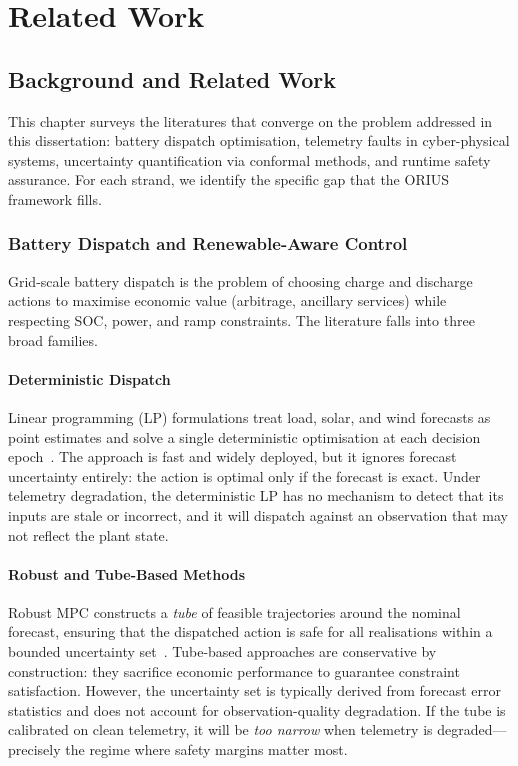 \chapter{Related Work}
\label{ch:ch02_related_work}


\section{Background and Related Work}
\label{ch:related-work}

This chapter surveys the literatures that converge on the problem
addressed in this dissertation: battery dispatch optimisation, telemetry
faults in cyber-physical systems, uncertainty quantification via conformal
methods, and runtime safety assurance.  For each strand, we identify the
specific gap that the ORIUS framework fills.

\subsection{Battery Dispatch and Renewable-Aware Control}

Grid-scale battery dispatch is the problem of choosing charge and
discharge actions to maximise economic value (arbitrage, ancillary
services) while respecting SOC, power, and ramp constraints.  The
literature falls into three broad families.

\subsubsection{Deterministic Dispatch}

Linear programming (LP) formulations treat load, solar, and wind
forecasts as point estimates and solve a single deterministic optimisation
at each decision epoch~\cite{xu2020optimal}.  The approach is fast and
widely deployed, but it ignores forecast uncertainty entirely: the action
is optimal only if the forecast is exact.  Under telemetry degradation,
the deterministic LP has no mechanism to detect that its inputs are stale
or incorrect, and it will dispatch against an observation that may not
reflect the plant state.

\subsubsection{Robust and Tube-Based Methods}

Robust MPC constructs a \emph{tube} of feasible trajectories around the
nominal forecast, ensuring that the dispatched action is safe for all
realisations within a bounded uncertainty set~\cite{bemporad2007robust}.
Tube-based approaches are conservative by construction: they sacrifice
economic performance to guarantee constraint satisfaction.  However, the
uncertainty set is typically derived from forecast error statistics and
does not account for observation-quality degradation.  If the tube is
calibrated on clean telemetry, it will be \emph{too narrow} when telemetry
is degraded---precisely the regime where safety margins matter most.

